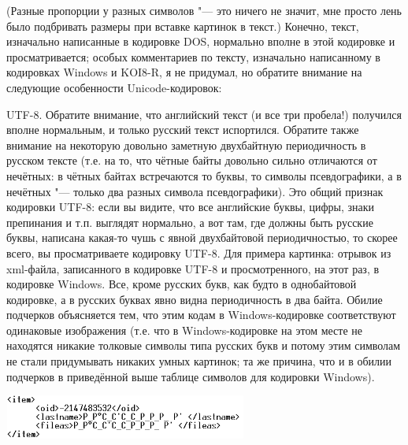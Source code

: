 (Разные пропорции у разных символов "--- это ничего не значит, мне просто лень было подбривать 
размеры при вставке картинок в текст.) Конечно, текст, изначально написанные в кодировке DOS, 
нормально вполне в этой кодировке и просматривается; особых комментариев по тексту, изначально 
написанному в кодировках Windows и KOI8-R, я не придумал, но обратите внимание на следующие 
особенности Unicode-кодировок:


\begin{ulist}
\item UTF-8.  Обратите внимание, что английский текст (и все три пробела!) получился вполне нормальным, и только русский 
текст испортился. Обратите также внимание на некоторую довольно заметную двухбайтную периодичность 
в русском тексте
(т.е. на то, что чётные байты довольно сильно отличаются от нечётных: в чётных байтах встречаются 
то буквы, то символы псевдографики, а в нечётных "--- только два разных символа псевдографики).
Это общий признак кодировки UTF-8: если вы видите, что все английские буквы, 
цифры, знаки препинания и т.п. выглядят нормально, а вот там, где должны быть русские буквы, 
написана какая-то чушь с явной двухбайтовой периодичностью, то скорее всего, вы просматриваете 
кодировку UTF-8. Для примера картинка: отрывок из xml-файла, записанного в кодировке UTF-8 и 
просмотренного, на этот раз, в кодировке Windows. Все, кроме русских букв, как будто в однобайтовой 
кодировке, а в русских буквах явно видна периодичность в два байта. Обилие подчерков объясняется 
тем, что этим кодам в Windows-кодировке соответствуют одинаковые изображения (т.е. что в 
Windows-кодировке на этом месте не находятся никакие толковые символы типа русских букв и потому
этим символам не стали придумывать никаких умных картинок; та же причина, что и в обилии подчерков в
приведённой выше таблице символов для кодировки Windows).
\begin{center}
\includegraphics[width=8cm,height=1.44cm]{ideas/03_1_encodings/utf8_contact.png}
\end{center}


\end{ulist}
